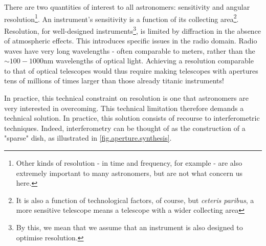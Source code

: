 \pg
There are two quantities of interest to all astronomers: sensitivity and angular resolution\footnote{Other kinds of resolution - in time and frequency, for example - are also extremely important to many astronomers, but are not what concern us here.}. An instrument's sensitivity is a function of its collecting area\footnote{It is also a function of technological factors, of course, but \emph{ceteris paribus}, a more sensitive telescope means a telescope with a wider collecting area}. Resolution, for well-designed instruments\footnote{By this, we mean that we assume that an instrument is also designed to optimise resolution.}, is limited by diffraction in the absence of atmospheric effects. This introduces specific issues in the radio domain. Radio waves have very long wavelengths - often comparable to meters, rather than the $\sim100-1000$nm wavelengths of optical light. Achieving a resolution comparable to that of optical telescopes would thus require making telescopes with apertures tens of millions of times larger than those already titanic instruments!

\pg
In practice, this technical constraint on resolution is one that astronomers are very interested in overcoming. This technical limitation therefore demands a technical solution. In practice, this solution consists of recourse to interferometric techniques. Indeed, interferometry can be thought of as the construction of a "sparse" dish, as illustrated in \cref{fig.aperture.synthesis}.

